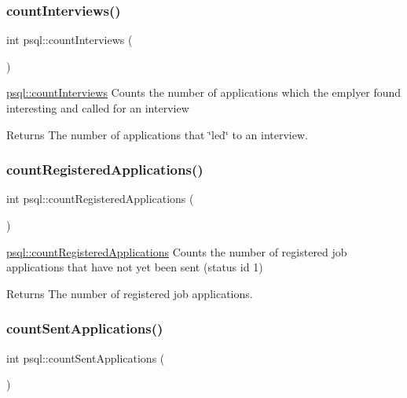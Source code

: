 \subsubsection{\texorpdfstring{count\+Interviews()}{countInterviews()}}
{\footnotesize\ttfamily int psql\+::count\+Interviews (\begin{DoxyParamCaption}{ }\end{DoxyParamCaption})}



\mbox{\hyperlink{classpsql_a5d382c01e6d7957e628ade338ddaf70b}{psql\+::count\+Interviews}} Counts the number of applications which the emplyer found interesting and called for an interview 

\begin{DoxyReturn}{Returns}
The number of applications that \char`\"{}led\char`\"{} to an interview. 
\end{DoxyReturn}
\mbox{\label{classpsql_ac6bb08051a489a4c36cad8bb7f1abd1c}} 
\subsubsection{\texorpdfstring{count\+Registered\+Applications()}{countRegisteredApplications()}}
{\footnotesize\ttfamily int psql\+::count\+Registered\+Applications (\begin{DoxyParamCaption}{ }\end{DoxyParamCaption})}



\mbox{\hyperlink{classpsql_ac6bb08051a489a4c36cad8bb7f1abd1c}{psql\+::count\+Registered\+Applications}} Counts the number of registered job applications that have not yet been sent (status id 1) 

\begin{DoxyReturn}{Returns}
The number of registered job applications. 
\end{DoxyReturn}
\mbox{\label{classpsql_a1aa2281c867a8a2916963ec9391c2320}} 
\subsubsection{\texorpdfstring{count\+Sent\+Applications()}{countSentApplications()}}
{\footnotesize\ttfamily int psql\+::count\+Sent\+Applications (\begin{DoxyParamCaption}{ }\end{DoxyParamCaption})}



